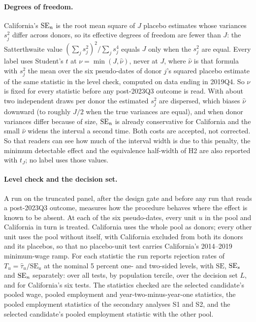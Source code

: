 \paragraph{Degrees of freedom.} California's $\mathrm{SE}_{n}$ is the root mean square of $J$ placebo
estimates whose variances $s_j^2$ differ across donors, so its effective degrees of freedom are
fewer than $J$: the Satterthwaite value $(\sum_j s_j^2)^2/\sum_j s_j^4$ equals $J$ only when the
$s_j^2$ are equal. Every label uses Student's $t$ at $\nu = \min(J, \hat\nu)$, never at $J$, where
$\hat\nu$ is that formula with $s_j^2$ the mean over the six pseudo-dates of donor $j$'s squared
placebo estimate of the same statistic in the level check, computed on data ending in 2019Q4. So
$\nu$ is fixed for every statistic before any post-2023Q3 outcome is read. With about two
independent draws per donor the estimated $s_j^2$ are dispersed, which biases $\hat\nu$ downward
(to roughly $J/2$ when the true variances are equal), and when donor variances differ because of
size, $\mathrm{SE}_{n}$ is already conservative for California and the small $\hat\nu$ widens the interval a
second time. Both costs are accepted, not corrected. So that readers can see how much of the
interval width is due to this penalty, the minimum detectable effect and the equivalence half-width
of H2 are also reported with $t_J$; no label uses those values.

\paragraph{Level check and the decision set.} A run on the truncated panel, after the design gate
and before any run that reads a post-2023Q3 outcome, measures how the procedure behaves where the
effect is known to be absent. At each of the six pseudo-dates, every unit $u$ in the pool and
California in turn is treated. California uses the whole pool as donors; every other unit uses the
pool without itself, with California excluded from both its donors and its placebos, so that no
placebo-unit test carries California's 2014--2019 minimum-wage ramp. For each statistic the run
reports rejection rates of $T_u = \hat\tau_u/\mathrm{SE}_u$ at the nominal 5 percent one- and
two-sided levels, with $\mathrm{SE}$, $\mathrm{SE}_{s}$ and $\mathrm{SE}_{n}$ separately: over all tests, by population
tercile, over the decision set $L$, and for California's six tests. The statistics checked are the
selected candidate's pooled wage, pooled employment and year-two-minus-year-one statistics, the
pooled employment statistics of the secondary analyses S1 and S2, and the selected candidate's
pooled employment statistic with the other pool.

